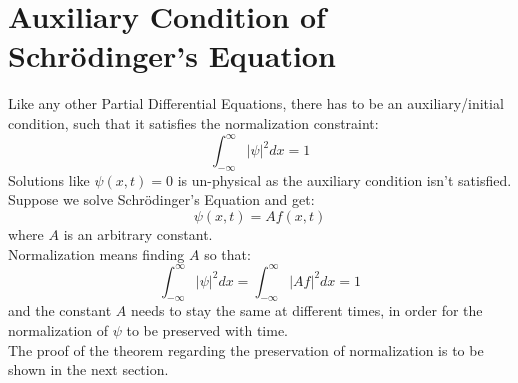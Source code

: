 \documentclass[hidelinks, a4paper, 12pt]{article}
\newcommand{\n}{\\[\baselineskip]}
\begin{document}
    \section{Auxiliary Condition of Schrödinger's Equation}
        Like any other Partial Differential Equations, there has to be an auxiliary/initial condition, 
        such that it satisfies the normalization constraint:
        \[\int_{-\infty}^{\infty}|\psi|^2dx = 1\]
        Solutions like $\psi(x, t) = 0$ is un-physical as the auxiliary condition isn't satisfied.\n
        Suppose we solve Schrödinger's Equation and get:
        \[\psi(x, t) = Af(x,t)\]
        where $A$ is an arbitrary constant.\n
        Normalization means finding $A$ so that:
        \[\int_{-\infty}^{\infty}|\psi|^2dx = \int_{-\infty}^{\infty}|Af|^2dx = 1\]
        and the constant $A$ needs to stay the same at different times, in order for the normalization of $\psi$ to be preserved with time.\n
        The proof of the theorem regarding the preservation of normalization is to be shown in the next section.
\end{document}
